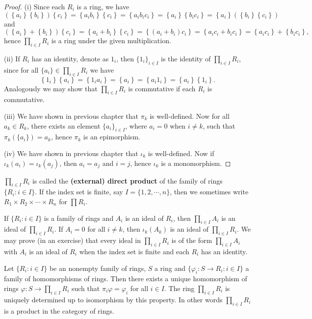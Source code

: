 \begin{proof}
(i) Since each $R_i$ is a ring, we have 
$$
\left( \left\{ a_i \right\} \left\{ b_i \right\} \right) \left\{ c_i \right\} =\left\{ a_ib_i \right\} \left\{ c_i \right\} =\left\{ a_ib_ic_i \right\} =\left\{ a_i \right\} \left\{ b_ic_i \right\} =\left\{ a_i \right\} \left( \left\{ b_i \right\} \left\{ c_i \right\} \right) 
$$
and 
$$
\left( \left\{ a_i \right\} +\left\{ b_i \right\} \right) \left\{ c_i \right\} =\left\{ a_i+b_i \right\} \left\{ c_i \right\} =\left\{ \left( a_i+b_i \right) c_i \right\} =\left\{ a_ic_i+b_ic_i \right\} =\left\{ a_ic_i \right\} +\left\{ b_ic_i \right\} ,
$$
hence $\prod_{i\in I}R_i$ is a ring under the given multiplication.\par
(ii) If $R_i$ has an identity, denote as $1_i$, then $\{1_i\}_{i\in I}$ is the identity of $\prod_{i\in I}R_i$, since for all $\{a_i\}\in\prod_{i\in I}R_i$ we have 
$$
\left\{ 1_i \right\} \left\{ a_i \right\} =\left\{ 1_ia_i \right\} =\left\{ a_i \right\} =\left\{ a_i1_i \right\} =\left\{ a_i \right\} \left\{ 1_i \right\} .
$$
Analogously we may show that $\prod_{i\in I}R_i$ is commutative if each $R_i$ is commutative.\par
(iii) We have shown in previous chapter that $\pi_k$ is well-defined. Now for all $a_k\in R_k$, there exists an element $\{a_i\}_{i\in I}$, where $a_i=0$ when $i\ne k$, such that $\pi_k(\{a_i\})=a_k$, hence $\pi_k$ is an epimorphism.\par
(iv) We have shown in previous chapter that $\iota_k$ is well-defined. Now if $\iota_k(a_i)=\iota_k(a_j)$, then $a_i=a_j$ and $i=j$, hence $\iota_k$ is a monomorphism.
\end{proof}
$\prod_{i\in I}R_i$ is called the \textbf{(external) direct product} of the family of rings $\{R_i:i\in I\}$. If the index set is finite, say $I=\{1,2,\cdots,n\}$, then we sometimes write $R_1\times R_2\times\cdots\times R_n$ for $\prod R_i$.\par
If $\{R_i:i\in I\}$ is a family of rings and $A_i$ is an ideal of $R_i$, then $\prod_{i\in I}A_i$ is an ideal of $\prod_{i\in I}R_i$. If $A_i=0$ for all $i\ne k$, then $\iota_k(A_k)$ is an ideal of $\prod_{i\in I}R_i$. We may prove (in an exercise) that every ideal in $\prod_{i\in I}R_i$ is of the form $\prod_{i\in I}A_i$ with $A_i$ is an ideal of $R_i$ when the index set is finite and each $R_i$ has an identity.
\begin{theorem}
Let $\{R_i:i\in I\}$ be an nonempty family of rings, $S$ a ring and $\{\varphi_i:S\to R_i:i\in I\}$ a family of homomorphisms of rings. Then there exists a unique homomorphism of rings $\varphi:S\to\prod_{i\in I}R_i$ such that $\pi_i\varphi=\varphi_i$ for all $i\in I$. The ring $\prod_{i\in I}R_i$ is uniquely determined up to isomorphism by this property. In other words $\prod_{i\in I}R_i$ is a product in the category of rings.
\end{theorem}

